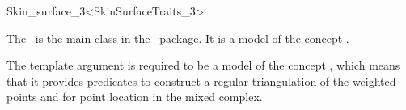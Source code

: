 
\begin{ccRefClass}{Skin_surface_3<SkinSurfaceTraits_3>}
  \ccDefinition

  The \ccRefName\ is the main class in the
  \ package. It is a model of
  the concept .  

  The template argument is required to be a model of the concept
  , which means that it provides predicates
  to construct a regular triangulation of the weighted points and for
  point location in the mixed complex.
  




  \ccIsModel {} 
%
%
%


\end{ccRefClass}
